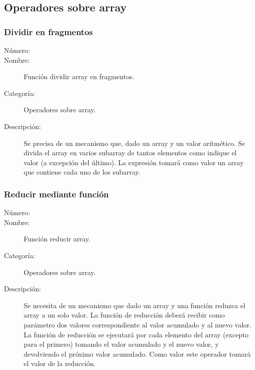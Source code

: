 \subsection{Operadores sobre array}

\subsubsection{Dividir en fragmentos}
\begin{framed}
	\begin{description}
		\item [Número:] \cn
		\item [Nombre:] Función dividir array en fragmentos.
		\item [Categoría:] Operadores sobre array.
		\item [Descripción:] Se precisa de un mecanismo que, dado un array y un valor aritmético. Se divida el array en varios subarray de tantos
      elementos como indique el valor (a excepción del último). 
      La expresión tomará como valor un array que contiene cada uno de los subarray.
	\end {description}
\end{framed}

\subsubsection{Reducir mediante función}
\begin{framed}
	\begin{description}
		\item [Número:] \cn
		\item [Nombre:] Función reducir array.
		\item [Categoría:] Operadores sobre array.
		\item [Descripción:] Se necesita de un mecanismo que dado un array y una función reduzca el array a un solo valor.
      La función de reducción deberá recibir como parámetro dos valores correspondiente al valor acumulado y al nuevo valor. 
      La función de reducción se ejecutará por cada elemento del array (excepto para el primero) tomando el valor acumulado y el nuevo valor, y devolviendo
      el próximo valor acumulado. Como valor este operador tomará el valor de la reducción. 
	\end {description}
\end{framed}


